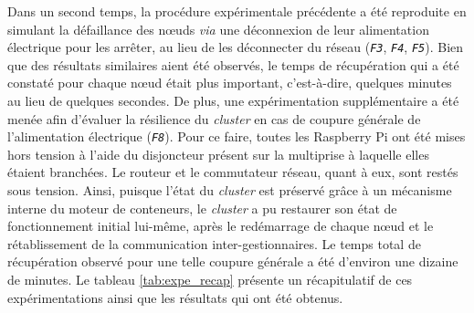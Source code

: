 Dans un second temps, la procédure expérimentale précédente a été reproduite en simulant la défaillance des n\oe{}uds \textit{via} une déconnexion de leur alimentation électrique pour les arrêter, au lieu de les déconnecter du réseau (\textit{\texttt{F3}}, \textit{\texttt{F4}}, \textit{\texttt{F5}}). Bien que des résultats similaires aient été observés, le temps de récupération qui a été constaté pour chaque n\oe{}ud était plus important, c'est-à-dire, quelques minutes au lieu de quelques secondes. De plus, une expérimentation supplémentaire a été menée afin d'évaluer la résilience du \textit{cluster} en cas de coupure générale de l'alimentation électrique (\textit{\texttt{F8}}). Pour ce faire, toutes les Raspberry Pi ont été mises hors tension à l'aide du disjoncteur présent sur la multiprise à laquelle elles étaient branchées. Le routeur et le commutateur réseau, quant à eux, sont restés sous tension. Ainsi, puisque l'état du \textit{cluster} est préservé grâce à un mécanisme interne du moteur de conteneurs, le \textit{cluster} a pu restaurer son état de fonctionnement initial lui-même, après le redémarrage de chaque n\oe{}ud et le rétablissement de la communication inter-gestionnaires. Le temps total de récupération observé pour une telle coupure générale a été d'environ une dizaine de minutes. Le tableau \ref{tab:expe_recap} présente un récapitulatif de ces expérimentations ainsi que les résultats qui ont été obtenus.

